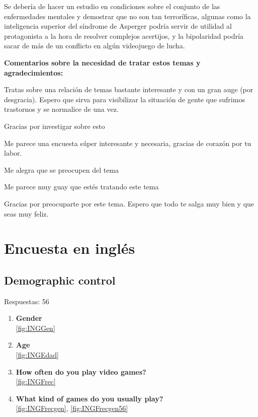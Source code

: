 \documentclass[12pt, a4paper,twoside,titlepage]{book}
\begin{document}
\begin{enumerate}[label=\textbf{\arabic*}.]
    Se debería de hacer un estudio en condiciones sobre el conjunto de las enfermedades mentales y demostrar que no son tan terroríficas, algunas como la inteligencia superior del síndrome de Asperger podría servir de utilidad al protagonista a la hora de resolver complejos acertijos, y la bipolaridad podría sacar de más de un conflicto en algún videojuego de lucha.

    \textbf{Comentarios sobre la necesidad de tratar estos temas y agradecimientos:}
    
    Tratas sobre una relación de temas bastante interesante y con un gran auge (por desgracia). Espero que sirva para visibilizar la situación de gente que sufrimos trastornos y se normalice de una vez.
    
    Gracias por investigar sobre esto 
    
    Me parece una encuesta súper interesante y necesaria, gracias de corazón por tu labor. 
    
    Me alegra que se preocupen del tema
    
    Me parece muy guay que estés tratando este tema
    
    Gracias por preocuparte por este tema. Espero que todo te salga muy bien y que seas muy feliz. 

    
\end{enumerate}




\newpage

\section{Encuesta en inglés}

\subsection{Demographic control}
Respuestas: 56
\begin{enumerate}[label=\textbf{\arabic*}.]
     \item \textbf{Gender}\\
     \ref{fig:INGGen}
     \item \textbf{Age}\\
     \ref{fig:INGEdad}
     \item \textbf{How often do you play video games?}\\
     \ref{fig:INGFrec}
     \item \textbf{What kind of games do you usually play?}\\
     \ref{fig:INGFrecgen}, \ref{fig:INGFrecgen56}
\end{enumerate}
\end{document}
